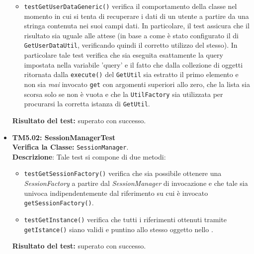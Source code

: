 \begin{itemize}
\begin{itemize}
\item \texttt{testGetUserDataGeneric()} verifica il comportamento della classe nel momento in cui si tenta di recuperare i dati di un utente a partire da una stringa contenuta nei suoi campi dati. In particolare, il test assicura che il risultato sia uguale alle attese (in base a come è stato configurato il  di \texttt{GetUserDataUtil}, verificando quindi il corretto utilizzo del  stesso). In particolare tale test verifica che sia eseguita esattamente la query impostata nella variabile 'query' e il fatto che dalla collezione di oggetti ritornata dalla \texttt{execute()} del \texttt{GetUtil} sia estratto il primo elemento e non sia \textit{mai} invocato \texttt{get} con argomenti superiori allo zero, che la lista sia scorsa solo se non è vuota e che la \texttt{UtilFactory} sia utilizzata per procurarsi la corretta istanza di \texttt{GetUtil}.

\end{itemize} 
\textbf{Risultato del test:} superato con successo.




\item \textbf{TM5.02: SessionManagerTest}\\
\textbf{Verifica la Classe:} \texttt{SessionManager}.\\
\textbf{Descrizione}: %
Tale test si compone di due metodi: 
\begin{itemize}
\item \texttt{testGetSessionFactory()} verifica che sia possibile ottenere una \textit{SessionFactory} a partire dal \textit{SessionManager} di invocazione e che tale sia univoca indipendentemente dal riferimento su cui è invocato \texttt{getSessionFactory()}.

\item \texttt{testGetInstance()} verifica che tutti i riferimenti ottenuti tramite \texttt{getIstance()} siano validi e puntino allo stesso oggetto nello .


\end{itemize}
\textbf{Risultato del test:} superato con successo.



\end{itemize}
